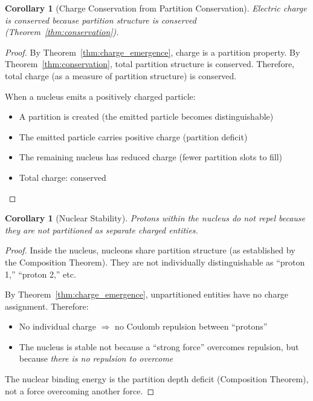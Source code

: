 \documentclass[twocolumn,10pt,a4paper]{article}
\newtheorem{corollary}[theorem]{Corollary}
\theoremstyle{definition}
\theoremstyle{remark}
\begin{document}
\begin{corollary}[Charge Conservation from Partition Conservation]
\label{cor:charge_conservation}
Electric charge is conserved because partition structure is conserved (Theorem~\ref{thm:conservation}).
\end{corollary}

\begin{proof}
By Theorem~\ref{thm:charge_emergence}, charge is a partition property. By Theorem~\ref{thm:conservation}, total partition structure is conserved. Therefore, total charge (as a measure of partition structure) is conserved.

When a nucleus emits a positively charged particle:
\begin{itemize}
    \item A partition is created (the emitted particle becomes distinguishable)
    \item The emitted particle carries positive charge (partition deficit)
    \item The remaining nucleus has reduced charge (fewer partition slots to fill)
    \item Total charge: conserved
\end{itemize}
\end{proof}

\begin{corollary}[Nuclear Stability]
\label{cor:nuclear_stability}
Protons within the nucleus do not repel because they are not partitioned as separate charged entities.
\end{corollary}

\begin{proof}
Inside the nucleus, nucleons share partition structure (as established by the Composition Theorem). They are not individually distinguishable as ``proton 1,'' ``proton 2,'' etc.

By Theorem~\ref{thm:charge_emergence}, unpartitioned entities have no charge assignment. Therefore:
\begin{itemize}
    \item No individual charge $\Rightarrow$ no Coulomb repulsion between ``protons''
    \item The nucleus is stable not because a ``strong force'' overcomes repulsion, but because \emph{there is no repulsion to overcome}
\end{itemize}

The nuclear binding energy is the partition depth deficit (Composition Theorem), not a force overcoming another force.
\end{proof}
\end{document}
